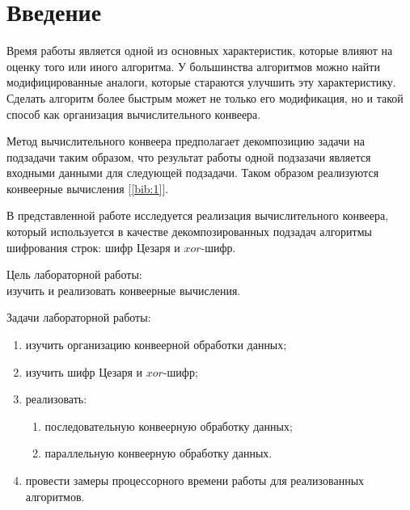 \section*{\large Введение}

\par Время работы является одной из основных характеристик, которые влияют на оценку того или иного алгоритма. У большинства алгоритмов можно найти модифицированные аналоги, которые стараются улучшить эту характеристику. Сделать алгоритм более быстрым может не только его модификация, но и такой способ как организация вычислительного конвеера.
\par Метод вычислительного конвеера предполагает декомпозицию задачи на подзадачи таким образом, что результат работы одной подзазачи является входными данными для следующей подзадачи. Таком образом реализуются конвеерные вычисления [\ref{bib:1}].
\par В представленной работе исследуется реализация вычислительного конвеера, который используется в качестве декомпозированных подзадач алгоритмы шифрования строк: шифр Цезаря и $xor$-шифр.

	Цель лабораторной работы:\\
	изучить и реализовать конвеерные вычисления.

	Задачи лабораторной работы:
	\begin{enumerate}
		\item изучить организацию конвеерной обработки данных;
		\item изучить шифр Цезаря и $xor$-шифр;
		\item реализовать:
		\begin{enumerate}
			\item последовательную конвеерную обработку данных;
			\item параллельную конвеерную обработку данных.
		\end{enumerate}
		\item провести замеры процессорного времени работы для реализованных алгоритмов.
	\end{enumerate}
\newpage